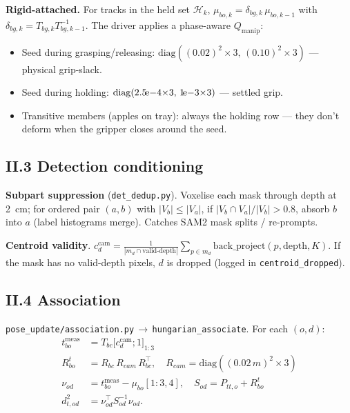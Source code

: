 \documentclass[11pt]{article}
\newcommand{\file}[1]{\texttt{#1}}
\begin{document}
\textbf{Rigid-attached.} For tracks in the held set $\mathcal{H}_k$,
$\mu_{bo,k} = \delta_{bg,k}\,\mu_{bo,k-1}$ with
$\delta_{bg,k} = T_{bg,k}T_{bg,k-1}^{-1}$. The driver applies a
phase-aware $Q_{\text{manip}}$:
\begin{itemize}
\item Seed during grasping/releasing: $\mathrm{diag}((0.02)^2{\times}3,\,(0.10)^2{\times}3)$ — physical grip-slack.
\item Seed during holding: $\mathrm{diag}(2.5\!{\rm e}{-4}{\times}3,\,1\!{\rm e}{-3}{\times}3)$ — settled grip.
\item Transitive members (apples on tray): always the holding row — they don't deform when the gripper closes around the seed.
\end{itemize}

\subsection*{II.3 Detection conditioning}

\textbf{Subpart suppression} (\file{det\_dedup.py}).
Voxelise each mask through depth at 2~cm; for ordered pair $(a,b)$
with $|V_b|\le|V_a|$, if $|V_b\cap V_a|/|V_b|>0.8$, absorb $b$ into $a$
(label histograms merge). Catches SAM2 mask splits / re-prompts.

\textbf{Centroid validity}.
$c_d^{\text{cam}} = \frac{1}{|m_d\cap\text{valid-depth}|}\sum_{p\in m_d}\mathrm{back\_project}(p,\mathrm{depth},K)$.
If the mask has no valid-depth pixels, $d$ is dropped (logged in
\texttt{centroid\_dropped}).

\subsection*{II.4 Association}

\file{pose\_update/association.py}\,$\to$\,\texttt{hungarian\_associate}.
For each $(o,d)$:
\begin{align*}
  t_{bo}^{\text{meas}} &= T_{bc}\bigl[c_d^{\text{cam}}; 1\bigr]_{1:3} \\
  R_{bo}^t &= R_{bc}\,R_{cam}\,R_{bc}^\top, \quad R_{cam} = \mathrm{diag}((0.02\,m)^2{\times}3) \\
  \nu_{od} &= t_{bo}^{\text{meas}} - \mu_{bo}[1{:}3, 4],\quad
  S_{od} = P_{tt,o} + R_{bo}^t \\
  d^2_{t,od} &= \nu_{od}^\top S_{od}^{-1} \nu_{od}.
\end{align*}
\end{document}
